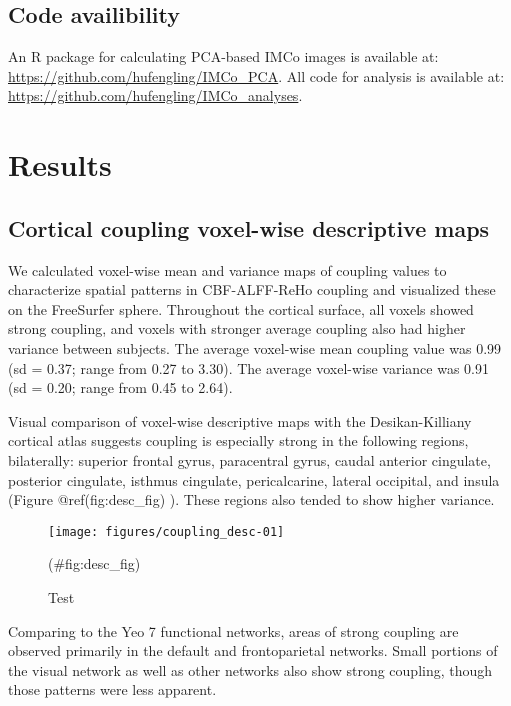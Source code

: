 \documentclass[
  12pt,
]{article}
\begin{document}
\hypertarget{code-availibility}{%
\subsection{Code availibility}\label{code-availibility}}

An R package for calculating PCA-based IMCo images is available at: \url{https://github.com/hufengling/IMCo_PCA}. All code for analysis is available at: \url{https://github.com/hufengling/IMCo_analyses}.

\hypertarget{results}{%
\section{Results}\label{results}}

\hypertarget{cortical-coupling-voxel-wise-descriptive-maps}{%
\subsection{Cortical coupling voxel-wise descriptive maps}\label{cortical-coupling-voxel-wise-descriptive-maps}}

We calculated voxel-wise mean and variance maps of coupling values to characterize spatial patterns in CBF-ALFF-ReHo coupling and visualized these on the FreeSurfer sphere. Throughout the cortical surface, all voxels showed strong coupling, and voxels with stronger average coupling also had higher variance between subjects. The average voxel-wise mean coupling value was 0.99 (sd = 0.37; range from 0.27 to 3.30). The average voxel-wise variance was 0.91 (sd = 0.20; range from 0.45 to 2.64).

Visual comparison of voxel-wise descriptive maps with the Desikan-Killiany cortical atlas \citep{desikanAutomatedLabelingSystem2006a} suggests coupling is especially strong in the following regions, bilaterally: superior frontal gyrus, paracentral gyrus, caudal anterior cingulate, posterior cingulate, isthmus cingulate, pericalcarine, lateral occipital, and insula (Figure @ref(fig:desc\_fig) ). These regions also tended to show higher variance.

\begin{figure}
\texttt{[image: figures/coupling\_desc-01]} \caption{Test}(\#fig:desc_fig)
\end{figure}

Comparing to the Yeo 7 functional networks, areas of strong coupling are observed primarily in the default and frontoparietal networks. Small portions of the visual network as well as other networks also show strong coupling, though those patterns were less apparent.
\end{document}
